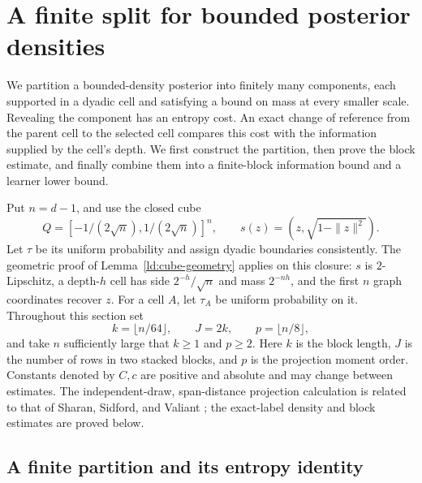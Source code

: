 \section{A finite split for bounded posterior densities}
\label{l:bounded-split:section}

We partition a bounded-density posterior into finitely many components,
each supported in a dyadic cell and satisfying a bound on mass at every
smaller scale.  Revealing the component has an entropy cost.  An exact
change of reference from the parent cell to the selected cell compares
this cost with the information supplied by the cell's depth.  We first
construct the partition, then prove the block estimate, and finally combine them
into a finite-block information bound and a learner lower bound.

Put \(n=d-1\), and use the closed cube
\[
 Q=[-1/(2\sqrt n),1/(2\sqrt n)]^n,\qquad
 s(z)=(z,\sqrt{1-\|z\|^2}).
\]
Let \(\tau\) be its uniform probability and assign dyadic boundaries
consistently.  The geometric proof of Lemma~\ref{ld:cube-geometry}
applies on this closure: \(s\) is \(2\)-Lipschitz, a depth-\(h\)
cell has side \(2^{-h}/\sqrt n\) and mass \(2^{-nh}\), and the
first \(n\) graph coordinates recover \(z\).  For a cell \(A\), let
\(\tau_A\) be uniform probability on it.
Throughout this section set
\[
 k=\lfloor n/64\rfloor,\qquad J=2k,\qquad p=\lfloor n/8\rfloor,
\]
and take \(n\) sufficiently large that \(k\ge1\) and \(p\ge2\).
Here \(k\) is the block length, \(J\) is the number of rows in two
stacked blocks, and \(p\) is the projection moment order.
Constants denoted by \(C,c\) are positive and absolute and may change
between estimates.  The independent-draw, span-distance projection
calculation is related to that of Sharan, Sidford, and Valiant
\cite{SSV2019}; the exact-label density and block estimates are proved
below.

\subsection{A finite partition and its entropy identity}

